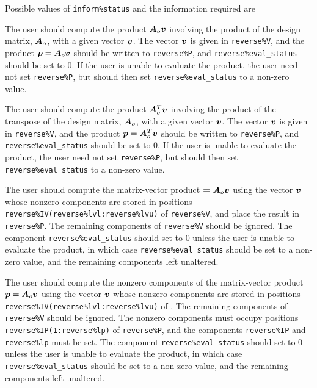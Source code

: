 \documentclass{galahad}
\begin{document}
Possible values of {\tt inform\%status} and the information required are
\begin{description}

 The user should compute the product ${\bm{A}}_o {\bm{v}}$
     involving the product of the design matrix, ${\bm{A}}_o$,
     with a given vector ${\bm{v}}$.
     The vector ${\bm{v}}$ is given in {\tt reverse\%V}, and the
     product ${\bm{p}} = {\bm{A}}_o {\bm{v}}$ should be written to {\tt reverse\%P},
     and  {\tt reverse\%eval\_status} should be set to 0.
     If the user is unable to evaluate the product,
     the user need not set {\tt reverse\%P}, but
     should then set {\tt reverse\%eval\_status} to a non-zero value.

 The user should compute the product ${\bm{A}}_o^T {\bm{v}}$
     involving the product of the transpose of the design matrix,
     ${\bm{A}}_o$,  with a given vector ${\bm{v}}$.
     The vector ${\bm{v}}$ is given in {\tt reverse\%V}, and the
     product ${\bm{p}} = {\bm{A}}_o^T {\bm{v}}$ should be written to {\tt reverse\%P},
     and  {\tt reverse\%eval\_status} should be set to 0.
     If the user is unable to evaluate the product,
     the user need not set {\tt reverse\%P}, but
     should then set {\tt reverse\%eval\_status} to a non-zero value.

 The user should compute the matrix-vector product $\bm = {\bm{A}}_o {\bm{v}}$
     using the vector ${\bm{v}}$ whose nonzero components are stored in positions
     {\tt reverse\%IV(reverse\%lvl:reverse\%lvu)}
     of {\tt reverse\%V}, and place the result in {\tt reverse\%P}.
     The remaining components of  {\tt reverse\%V} should be ignored.
     The component {\tt reverse\%eval\_status} should set to 0 unless the
     user is unable to evaluate the product, in which case
     {\tt reverse\%eval\_status} should be set to a non-zero value, and the
     remaining components left unaltered.

 The user should compute the nonzero components of the
     matrix-vector product ${\bm{p}} = {\bm{A}}_o {\bm{v}}$ using the vector ${\bm{v}}$ whose
     nonzero components are stored in positions
     {\tt reverse\%IV(reverse\%lvl:reverse\%lvu)}
     of . The remaining components of
     {\tt reverse\%V} should be ignored. The nonzero components must
     occupy positions
     {\tt reverse\%IP(1:reverse\%lp)} of {\tt reverse\%P},
     and the components
     {\tt reverse\%IP} and {\tt reverse\%lp} must be set.
     The component {\tt reverse\%eval\_status} should set to 0 unless the
     user is unable to evaluate the product, in which case
     {\tt reverse\%eval\_status} should be set to a non-zero value, and the
      remaining components left unaltered.


\end{description}
\end{document}
